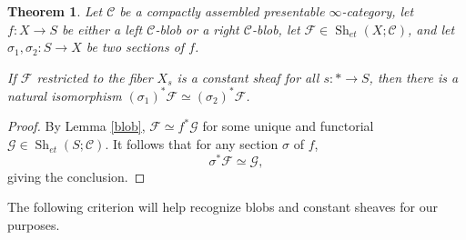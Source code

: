 \documentclass[12pt]{article}
\newtheorem{theorem}{Theorem}[section]
\newcommand{\on}{\operatorname}
\newcommand{\mc}{\mathcal}
\begin{document}
\begin{theorem}\label{blobsections}
Let $\mathcal{C}$ be a compactly assembled presentable $\infty$-category, let $f:X\to S$ be either a left $\mc{C}$-blob or a right $\mc{C}$-blob, let $\mathcal{F}\in\on{Sh}_{et}(X;\mc{C})$, and let $\sigma_1,\sigma_2:S\to X$ be two sections of $f$.

If $\mathcal{F}$ restricted to the fiber $X_s$ is a constant sheaf for all $s:\ast\to S$, then there is a natural isomorphism $(\sigma_1)^\ast \mc{F}\simeq (\sigma_2)^\ast\mathcal{F}$.

\end{theorem}
\begin{proof}
By Lemma \ref{blob}, $\mathcal{F}\simeq f^\ast\mc{G}$ for some unique and functorial $\mc{G}\in\on{Sh}_{et}(S;\mc{C})$.  It follows that for any section $\sigma$ of $f$,
$$\sigma^\ast\mathcal{F}\simeq \mc{G},$$
giving the conclusion.
\end{proof}

The following criterion will help recognize blobs and constant sheaves for our purposes.
\end{document}
